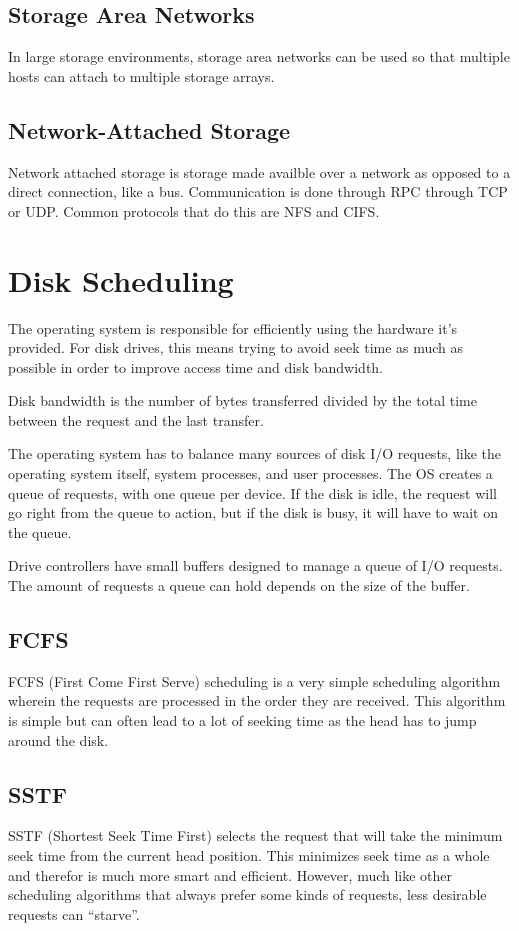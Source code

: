 \documentclass{article}
\begin{document}
\subsection{Storage Area Networks}
In large storage environments, storage area networks can be used so that
multiple hosts can attach to multiple storage arrays.

\subsection{Network-Attached Storage}
Network attached storage is storage made availble over a network as opposed to
a direct connection, like a bus. Communication is done through RPC through TCP
or UDP. Common protocols that do this are NFS and CIFS.

\section{Disk Scheduling}
The operating system is responsible for efficiently using the hardware it's
provided. For disk drives, this means trying to avoid seek time as much as
possible in order to improve access time and disk bandwidth.

Disk bandwidth is the number of bytes transferred divided by the total time
between the request and the last transfer.

The operating system has to balance many sources of disk I/O requests, like
the operating system itself, system processes, and user processes. The OS
creates a queue of requests, with one queue per device. If the disk is idle,
the request will go right from the queue to action, but if the disk is busy,
it will have to wait on the queue.

Drive controllers have small buffers designed to manage a queue of I/O
requests. The amount of requests a queue can hold depends on the size of the
buffer.

\subsection{FCFS}
FCFS (First Come First Serve) scheduling is a very simple scheduling algorithm
wherein the requests are processed in the order they are received. This
algorithm is simple but can often lead to a lot of seeking time as the head
has to jump around the disk.

\subsection{SSTF}
SSTF (Shortest Seek Time First) selects the request that will take the minimum
seek time from the current head position. This minimizes seek time as a whole
and therefor is much more smart and efficient. However, much like other
scheduling algorithms that always prefer some kinds of requests, less desirable
requests can ``starve''.
\end{document}
